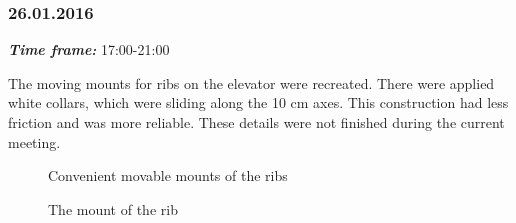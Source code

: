 \subsubsection{26.01.2016}
\textit{\textbf{Time frame:}} 17:00-21:00

The moving mounts for ribs on the elevator were recreated. There were applied white collars, which were sliding along the 10 cm axes. This construction had less friction and was more reliable. These details were not finished during the current meeting.

\begin{figure}[H]
	\begin{minipage}[h]{0.47\linewidth}
		\caption{Convenient movable mounts of the ribs}
	\end{minipage}
	\hfill
	\begin{minipage}[h]{0.47\linewidth}
		\caption{The mount of the rib}
	\end{minipage}
\end{figure}

